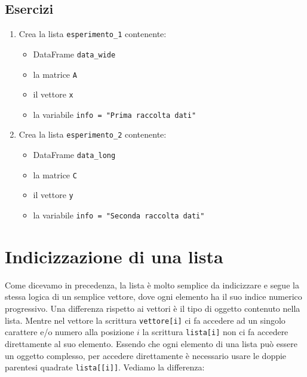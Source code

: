 \documentclass[
]{book}
\providecommand{\tightlist}{%
  \setlength{\itemsep}{0pt}\setlength{\parskip}{0pt}}
\begin{document}
\hypertarget{esercizi-12}{%
\subsection*{Esercizi}\label{esercizi-12}}

\begin{enumerate}
\def\labelenumi{\arabic{enumi}.}
\tightlist
\item
  Crea la lista \texttt{esperimento\_1} contenente:

  \begin{itemize}
  \tightlist
  \item
    DataFrame \texttt{data\_wide}
  \item
    la matrice \texttt{A}
  \item
    il vettore \texttt{x}
  \item
    la variabile \texttt{info\ =\ "Prima\ raccolta\ dati"}
  \end{itemize}
\item
  Crea la lista \texttt{esperimento\_2} contenente:

  \begin{itemize}
  \tightlist
  \item
    DataFrame \texttt{data\_long}
  \item
    la matrice \texttt{C}
  \item
    il vettore \texttt{y}
  \item
    la variabile \texttt{info\ =\ "Seconda\ raccolta\ dati"}
  \end{itemize}
\end{enumerate}

\hypertarget{indicizzazione-di-una-lista}{%
\section{Indicizzazione di una lista}\label{indicizzazione-di-una-lista}}

Come dicevamo in precedenza, la lista è molto semplice da indicizzare e segue la stessa logica di un semplice vettore, dove ogni elemento ha il suo indice numerico progressivo. Una differenza rispetto ai vettori è il tipo di oggetto contenuto nella lista. Mentre nel vettore la scrittura \texttt{vettore{[}i{]}} ci fa accedere ad un singolo carattere e/o numero alla posizione \(i\) la scrittura \texttt{lista{[}i{]}} non ci fa accedere direttamente al suo elemento. Essendo che ogni elemento di una lista può essere un oggetto complesso, per accedere direttamente è necessario usare le doppie parentesi quadrate \texttt{lista{[}{[}i{]}{]}}. Vediamo la differenza:
\end{document}
